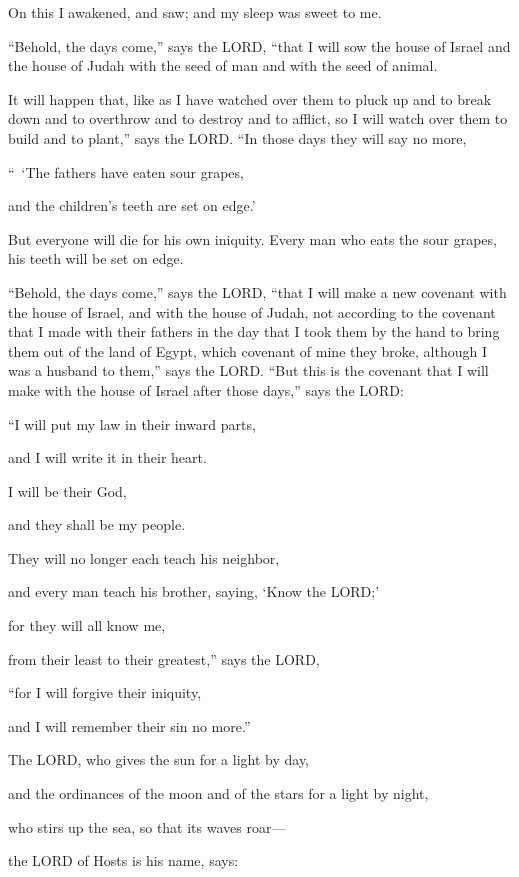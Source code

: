 \myverse{}On this I awakened, and saw; and my sleep was sweet to me.


\myverse{}“Behold, the days come,” says the LORD, “that I will sow the house of Israel and the house of Judah with the seed of man and with the seed of animal.

\myverse{}It will happen that, like as I have watched over them to pluck up and to break down and to overthrow and to destroy and to afflict, so I will watch over them to build and to plant,” says the LORD. \myverse{}“In those days they will say no more,

“ ‘The fathers have eaten sour grapes,
			
and the children’s teeth are set on edge.’
			
			
\myverse{}But everyone will die for his own iniquity. Every man
who eats the sour grapes, his teeth will be set on edge.


\myverse{}“Behold, the days come,” says the LORD, “that I will make a new covenant with the house of Israel, and with the house of Judah, \myverse{}not according to the covenant that I made with their fathers in the day that I took them by the hand to bring them out of the land of Egypt, which covenant of mine they broke, although I was a husband to them,” says the LORD. \myverse{}“But this is the covenant that I will make with the house of Israel after those days,” says the LORD:

“I will put my law in their inward parts,

and I will write it in their heart.

I will be their God,

and they shall be my people.


\myverse{}They will no longer each teach his neighbor,

and every man teach his brother, saying, ‘Know the LORD;’

for they will all know me,

from their least to their greatest,” says the LORD,

“for I will forgive their iniquity,

and I will remember their sin no more.”


\myverse{}The LORD, who gives the sun for a light by day,

and the ordinances of the moon and of the stars for a light by night,

who stirs up the sea, so that its waves roar—

the LORD of Hosts is his name, says:


